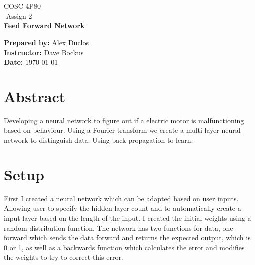 \documentclass[12pt]{article}
\def \LOGOPATH {assets/birzeit-logo.svg}
\def \DEPARTEMENT {COSC 4P80}
\def \COURSENAME {Assign 2}
\def \REPORTTITLE {Feed Forward Network}
\def \STUDENTNAME {Alex Duclos}
\def \INSTRUCTOR {Dave Bockus}
\begin{document}

\begin{titlepage}
    \vfill
    \begin{center}
         \\
        \hfill \\
        \Large{\DEPARTEMENT} \\
        \Large{\COURSENUM\;-\;\COURSENAME} \\
        \vfill
        \textbf{\LARGE{\REPORTTITLE}}
    \end{center}
    \vfill
    \begin{flushleft}
        \Large{\textbf{Prepared by:} \STUDENTNAME} \\
        \Large{\textbf{Instructor:} \INSTRUCTOR} \\
        \Large{\textbf{Date:} \today}
    \end{flushleft}
    \vfill
\end{titlepage}

{
\centering
\section*{Abstract}
Developing a neural network to figure out if a electric motor is malfunctioning based on behaviour. Using a Fourier transform we create a multi-layer neural network to distinguish data. Using back propagation to learn. 
\clearpage
}


\tableofcontents
\clearpage

\setlength{\parskip}{\baselineskip}%



\section{Setup}
First I created a neural network which can be adapted based on user inputs. Allowing user to specify the hidden layer count and to automatically create a input layer based on the length of the input. I created the initial weights using a random distribution function. The network has two functions for data, one forward which sends the data forward and returns the expected output, which is 0 or 1, as well as a backwards function which calculates the error and modifies the weights to try to correct this error. 
\end{document}
